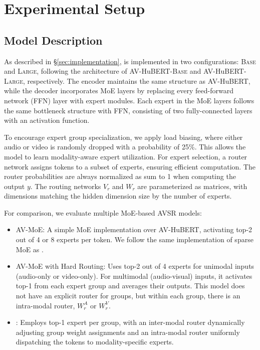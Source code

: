 \section{Experimental Setup}

\subsection{Model Description}
\label{appx:model_details}

As described in \S\ref{sec:implementation}, \ourmodel is implemented in two configurations: \textsc{Base} and \textsc{Large}, following the architecture of AV-HuBERT-\textsc{Base} and AV-HuBERT-\textsc{Large}, respectively. The encoder maintains the same structure as AV-HuBERT, while the decoder incorporates MoE layers by replacing every feed-forward network (FFN) layer with expert modules. Each expert in the MoE layers follows the same bottleneck structure with FFN, consisting of two fully-connected layers with an activation function. 

To encourage expert group specialization, we apply load biasing, where either audio or video is randomly dropped with a probability of 25\%. This allows the model to learn modality-aware expert utilization. For expert selection, a router network assigns tokens to a subset of experts, ensuring efficient computation. The router probabilities are always normalized as sum to 1 when computing the output $y$. The routing networks $V_r$ and $W_r$ are parameterized as matrices, with dimensions matching the hidden dimension size by the number of experts.

For comparison, we evaluate multiple MoE-based AVSR models:
\begin{itemize}[leftmargin=10pt, label={$\circ$}]
\setlength\itemsep{-0.1em}
\vspace{-10pt}
    \item AV-MoE: A simple MoE implementation over AV-HuBERT, activating top-2 out of 4 or 8 experts per token. We follow the same implementation of sparse MoE as \citep{dai2022stablemoe, jiang2024mixtral}.
    \item AV-MoE with Hard Routing: Uses top-2 out of 4 experts for unimodal inputs (audio-only or video-only). For multimodal (audio-visual) inputs, it activates top-1 from each expert group and averages their outputs. This model does not have an explicit router for groups, but within each group, there is an intra-modal router, \ie $W_r^A$ or $W_r^V$.
    \item \ourmodel: Employs top-1 expert per group, with an inter-modal router dynamically adjusting group weight assignments and an intra-modal router uniformly dispatching the tokens to modality-specific experts.
\end{itemize}


